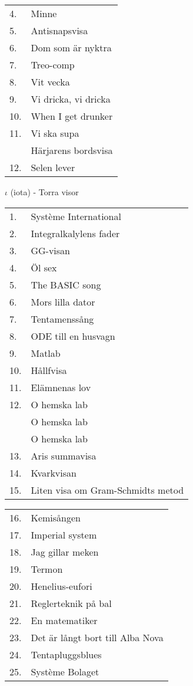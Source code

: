 \documentclass[a6paper,10pt]{article}
\begin{document}
\begin{table}[!h]
\begin{tabularx}{1\textwidth}{l X}
4.&Minne\\
5.&Antisnapsvisa\\
6.&Dom som är nyktra\\
7.&Treo-comp\\
8.&Vit vecka\\
9.&Vi dricka, vi dricka\\
10.&When I get drunker\\
11.&Vi ska supa\\
&Härjarens bordsvisa\\
12.&Selen lever
\end{tabularx}
\end{table}
\vspace{-5pt}
\noindent
\Large $\iota$ (iota) - Torra visor
\vspace{-5pt}
\begin{table}[!h]
\begin{tabularx}{1\textwidth}{l X}
1.&Système International\\
2.&Integralkalylens fader\\
3.&GG-visan\\
4.&Öl sex\\
5.&The BASIC song\\
6.&Mors lilla dator\\
7.&Tentamenssång\\
8.&ODE till en husvagn\\
9.&Matlab\\
10.&Hållfvisa\\
11.&Elämnenas lov\\
12.&O hemska lab\\
&O hemska lab\\
&O hemska lab\\
13.&Aris summavisa\\
14.&Kvarkvisan\\
15.&Liten visa om Gram-Schmidts metod\\
\end{tabularx}
\end{table}
\begin{table}[!h]
\begin{tabularx}{1\textwidth}{l X}
16.&Kemisången\\
17.&Imperial system\\
18.&Jag gillar meken\\
19.&Termon\\
20.&Henelius-eufori\\
21.&Reglerteknik på bal\\
22.&En matematiker\\
23.&Det är långt bort till Alba Nova\\
24.&Tentapluggsblues\\
25.&Système Bolaget
\end{tabularx}
\end{table}
\end{document}
